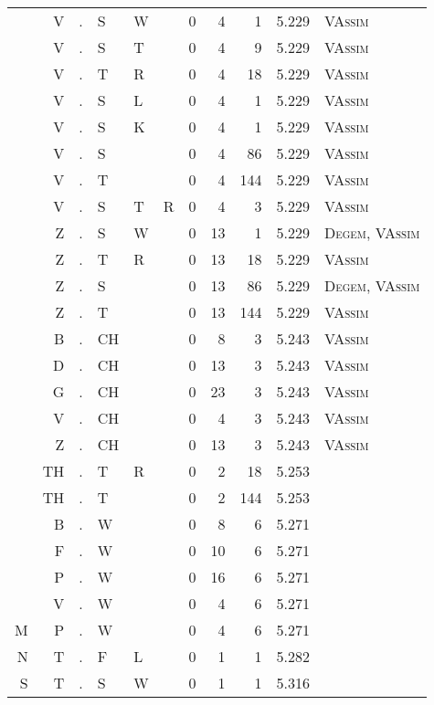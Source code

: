\begin{longtable}{r@{ } r@{ } c@{ } l@{ } l@{ } l@{ } r r r r l }
  & V & . & S & W &   & 0 & 4 & 1 & 5.229 & \textsc{VAssim} \\
  & V & . & S & T &   & 0 & 4 & 9 & 5.229 & \textsc{VAssim} \\
  & V & . & T & R &   & 0 & 4 & 18 & 5.229 & \textsc{VAssim} \\
  & V & . & S & L &   & 0 & 4 & 1 & 5.229 & \textsc{VAssim} \\
  & V & . & S & K &   & 0 & 4 & 1 & 5.229 & \textsc{VAssim} \\
  & V & . & S &   &   & 0 & 4 & 86 & 5.229 & \textsc{VAssim} \\
  & V & . & T &   &   & 0 & 4 & 144 & 5.229 & \textsc{VAssim} \\
  & V & . & S & T & R & 0 & 4 & 3 & 5.229 & \textsc{VAssim} \\
  & Z & . & S & W &   & 0 & 13 & 1 & 5.229 & \textsc{Degem}, \textsc{VAssim} \\
  & Z & . & T & R &   & 0 & 13 & 18 & 5.229 & \textsc{VAssim} \\
  & Z & . & S &   &   & 0 & 13 & 86 & 5.229 & \textsc{Degem}, \textsc{VAssim} \\
  & Z & . & T &   &   & 0 & 13 & 144 & 5.229 & \textsc{VAssim} \\
  & B & . & CH &   &   & 0 & 8 & 3 & 5.243 & \textsc{VAssim} \\
  & D & . & CH &   &   & 0 & 13 & 3 & 5.243 & \textsc{VAssim} \\
  & G & . & CH &   &   & 0 & 23 & 3 & 5.243 & \textsc{VAssim} \\
  & V & . & CH &   &   & 0 & 4 & 3 & 5.243 & \textsc{VAssim} \\
  & Z & . & CH &   &   & 0 & 13 & 3 & 5.243 & \textsc{VAssim} \\
  & TH & . & T & R &   & 0 & 2 & 18 & 5.253 &  \\
  & TH & . & T &   &   & 0 & 2 & 144 & 5.253 &  \\
  & B & . & W &   &   & 0 & 8 & 6 & 5.271 &  \\
  & F & . & W &   &   & 0 & 10 & 6 & 5.271 &  \\
  & P & . & W &   &   & 0 & 16 & 6 & 5.271 &  \\
  & V & . & W &   &   & 0 & 4 & 6 & 5.271 &  \\
M & P & . & W &   &   & 0 & 4 & 6 & 5.271 &  \\
N & T & . & F & L &   & 0 & 1 & 1 & 5.282 &  \\
S & T & . & S & W &   & 0 & 1 & 1 & 5.316 &  \\

\end{longtable}
